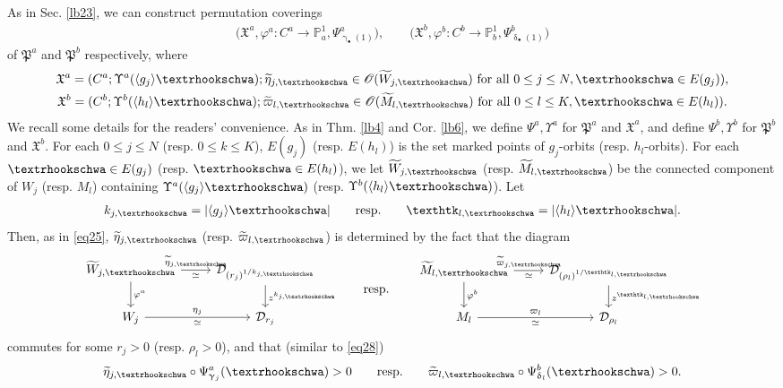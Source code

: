 \documentclass[12pt,a4paper,notitlepage]{article}
\theoremstyle{definition}
\theoremstyle{plain}
\newcommand{\fk}{\mathfrak}
\newcommand{\mc}{\mathcal}
\newcommand{\wtd}{\widetilde}
\newcommand{\bk}[1]{\langle {#1}\rangle}
\newcommand{\scr}{\mathscr}
\newcommand{\blt}{\bullet}
\newcommand{\Pbb}{\mathbb P}
\newcommand{\tipae}{\text{\textrhookschwa}}
\newcommand{\tipak}{\text{\texthtk}}
\numberwithin{equation}{subsection}
\begin{document}
As in Sec. \ref{lb23}, we can construct permutation coverings 
\begin{align*}
\big(\fk X^a,\varphi^a:C^a\rightarrow\Pbb^1_a,\Psi^a_{\upgamma_\blt(1)}\big),\qquad \big(\fk X^b,\varphi^b:C^b\rightarrow\Pbb^1_b,\Psi^b_{\updelta_\blt(1)}\big)
\end{align*}
of $\fk P^a$ and $\fk P^b$ respectively, where
\begin{gather*}
\fk X^a=	(C^a;\Upsilon^a(\bk{g_j}\tipae);\wtd\eta_{j,\tipae}\in\scr O(\wtd W_{j,\tipae})\text{ for all }0\leq j\leq N,\tipae\in E(g_j)),\\
\fk X^b=	(C^b;\Upsilon^b(\bk{h_l}\tipae);\wtd\varpi_{l,\tipae}\in\scr O(\wtd M_{l,\tipae})\text{ for all }0\leq l\leq K,\tipae\in E(h_l)).		
\end{gather*}
We recall some details for the readers' convenience.  As in Thm. \ref{lb4} and Cor. \ref{lb6},  we define $\Psi^a,\Upsilon^a$ for $\fk P^a$ and $\fk X^a$, and define $\Psi^b,\Upsilon^b$ for $\fk P^b$ and $\fk X^b$. For each $0\leq j\leq N$ (resp. $0\leq k\leq K$), $E(g_j)$ (resp. $E(h_l)$) is the set marked points of $g_j$-orbits (resp. $h_l$-orbits). For each $\tipae\in E(g_j)$ (resp. $\tipae\in E(h_l)$), we let $\wtd W_{j,\tipae}$ (resp. $\wtd M_{l,\tipae}$) be the connected component of $W_j$ (resp. $M_l$) containing $\Upsilon^a(\bk{g_j}\tipae)$ (resp. $\Upsilon^b(\bk{h_l}\tipae)$). Let
\begin{align*}
k_{j,\tipae}=|\bk{g_j}\tipae|\qquad\text{resp.}\qquad\tipak_{l,\tipae}=|\bk{h_l}\tipae|.	
\end{align*}
Then, as in \eqref{eq25}, $\wtd\eta_{j,\tipae}$ (resp. $\wtd\varpi_{l,\tipae}$) is determined by the fact that the diagram
\begin{equation}\label{eq57}
\begin{tikzcd}
	\wtd W_{j,\tipae} \arrow[r, "\wtd\eta_{j,\tipae}","\simeq"'] \arrow[d, "\varphi^a"]
	& \mc D_{(r_j)^{1/k_{j,\tipae}}} \arrow[d, "z^{k_{j,\tipae}}"] \\
	W_j \arrow[r,  "\eta_j","\simeq"']
	&  \mc D_{r_j}
\end{tikzcd}
\qquad \text{resp.}\qquad
\begin{tikzcd}
	\wtd M_{l,\tipae} \arrow[r, "\wtd\varpi_{j,\tipae}","\simeq"'] \arrow[d, "\varphi^b"]
	& \mc D_{(\rho_l)^{1/\tipak_{l,\tipae}}} \arrow[d, "z^{\tipak_{l,\tipae}}"] \\
	M_l \arrow[r,  "\varpi_l","\simeq"']
	&  \mc D_{\rho_l}
\end{tikzcd}	
\end{equation}
commutes for some $r_j>0$ (resp. $\rho_l>0$), and that (similar to \eqref{eq28})
\begin{align}
\wtd\eta_{j,\tipae}\circ\Psi^a_{\upgamma_j}(\tipae)>0\qquad\text{resp.}\qquad \wtd\varpi_{l,\tipae}\circ\Psi^b_{\updelta_l}(\tipae)>0.\label{eq58}	
\end{align}
\end{document}
